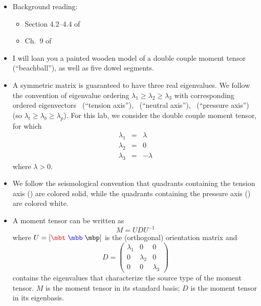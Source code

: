 \documentclass[11pt,titlepage,fleqn]{article}
\newcommand{\tvec}{\textcolor{red}{\mbt}}
\newcommand{\bvec}{\textcolor{blue}{\mbb}}
\newcommand{\pvec}{\textcolor{black}{\mbp}}
\begin{document}
\begin{itemize}

\item Background reading:
%
\begin{itemize}
\item Section 4.2--4.4 of \citet{SteinWysession}
\item Ch.~9 of \citet{ShearerE2}
\end{itemize}

\item I will loan you a painted wooden model of a double couple moment tensor (``beachball''), as well as five dowel segments.

\item A symmetric matrix is guaranteed to have three real eigenvalues. We follow the convention of eigenvalue ordering $\lambda_1 \ge \lambda_2 \ge \lambda_3$ with corresponding ordered eigenvectors \tvec\ (``tension axis''), \bvec\ (``neutral axis''), \pvec\ (``pressure axis'') (so $\lambda_t \ge \lambda_b \ge \lambda_p$). For this lab, we consider the double couple moment tensor, for which
%
\begin{eqnarray*}
\lambda_1 &=& \lambda
\\
\lambda_2 &=& 0
\\
\lambda_3 &=& -\lambda
\end{eqnarray*}
%
where $\lambda > 0$.

\item We follow the seismological convention that quadrants containing the tension axis (\tvec) are colored solid, while the quadrants containing the pressure axis (\pvec) are colored white.

\item A moment tensor can be written as \citep[][eq.~1]{TapeTape2012beach}
%
\begin{equation}
M = U D U^{-1}
\end{equation}
%
where $U = [\tvec\; \bvec \; \pvec]$ is the (orthogonal) orientation matrix and 
%
\begin{equation}
D = \begin{pmatrix} \lambda_1 & 0 & 0 \\ 0 & \lambda_2 & 0 \\ 0 & 0 & \lambda_3 \end{pmatrix}
\end{equation}
%
contains the eigenvalues that characterize the source type of the moment tensor. $M$ is the moment tensor in its standard basis; $D$ is the moment tensor in its eigenbasis.

\end{itemize}
\end{document}
